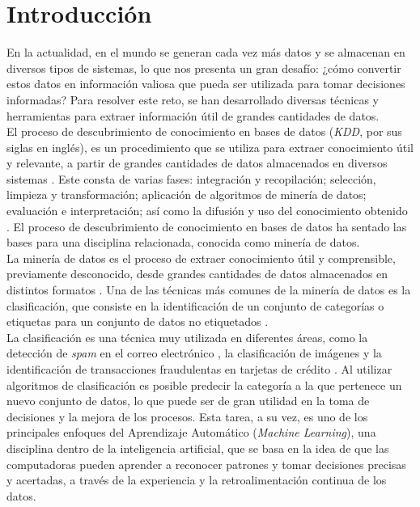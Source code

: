 \chapter*{Introducción}
En la actualidad, en el mundo se generan cada vez más datos y se almacenan en diversos tipos de sistemas, lo que nos presenta un gran desafío: ¿cómo convertir estos datos en información valiosa que pueda ser utilizada para tomar decisiones informadas? Para resolver este reto, se han desarrollado diversas técnicas y herramientas para extraer información útil de grandes cantidades de datos. \\
El proceso de descubrimiento de conocimiento en bases de datos (\textit{KDD}, por sus siglas en inglés), es un procedimiento que se utiliza para extraer conocimiento útil y relevante, a partir de grandes cantidades de datos almacenados en diversos sistemas \citep{orallo2004}. Este consta de varias fases: integración y recopilación; selección, limpieza y transformación; aplicación de algoritmos de minería de datos; evaluación e interpretación; así como la difusión y uso del conocimiento obtenido \citep{Han2011}. El proceso de descubrimiento de conocimiento en bases de datos ha sentado las bases para una disciplina relacionada, conocida como minería de datos. \\
La minería de datos es el proceso de extraer conocimiento útil y comprensible, previamente desconocido, desde grandes cantidades de datos almacenados en distintos formatos \citep{orallo2004}. Una de las técnicas más comunes de la minería de datos es la clasificación, que consiste en la identificación de un conjunto de categorías o etiquetas para un conjunto de datos no etiquetados \citep{orallo2004}. \\
La clasificación es una técnica muy utilizada en diferentes áreas, como la detección de \textit{spam} en el correo electrónico \citep{mendez2007sistemas}, la clasificación de imágenes \citep{borras2017clasificacion} y la identificación de transacciones fraudulentas en tarjetas de crédito \citep{dhankhad2018supervised}. Al utilizar algoritmos de clasificación es posible predecir la categoría a la que pertenece un nuevo conjunto de datos, lo que puede ser de gran utilidad en la toma de decisiones y la mejora de los procesos. Esta tarea, a su vez, es uno de los principales enfoques del Aprendizaje Automático (\textit{Machine Learning}), una disciplina dentro de la inteligencia artificial, que se basa en la idea de que las computadoras pueden aprender a reconocer patrones y tomar decisiones precisas y acertadas, a través de la experiencia y la retroalimentación continua de los datos. \\
